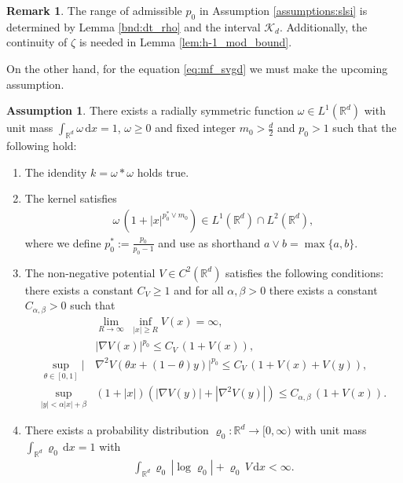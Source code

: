 \documentclass[reqno, 11pt]{amsart}
\numberwithin{equation}{section}
\theoremstyle{definition}
\newtheorem{Ass}[thm]{Assumption}
\newtheorem{rem}[thm]{Remark}
\begin{document}
\begin{rem}
    The range of admissible $p_0$ in Assumption \ref{assumptions:slsi} is determined by Lemma \ref{bnd:dt_rho} and the interval $\mathcal{K}_d$. Additionally, the continuity of $\zeta$ is needed in Lemma \ref{lem:h-1_mod_bound}.
\end{rem}

On the other hand, for the equation \eqref{eq:mf_svgd} we must make the upcoming assumption.

\begin{Ass}\label{assumptions:pot}
    There exists a radially symmetric function $\omega\in L^1(\mathbb{R}^{d})$ with unit mass $\int_{\mathbb{R}^{d}}\omega\,\mathrm{d} x=1$, $\omega \geq 0$ and fixed integer $m_0>\frac{d}{2}$ and $p_0>1$ such that the following hold:
    \begin{enumerate}[label=(B\arabic*)]
        \item The idendity $k=\omega\ast\omega$ holds true.
        \item\label{ass:sob_kern} The kernel satisfies
        \begin{align}
            \omega\,(1+|x|^{p_0^\ast\vee m_0})\in L^1(\mathbb{R}^d) \cap L^2(\mathbb{R}^d),
            \label{eq:pot_omega}
        \end{align}
        where we define $p_0^\ast:=\frac{p_0}{p_0-1}$ and use as shorthand $a\vee b=\max\{a,b\}$.
        
        \item\label{ass:pot}
        The non-negative potential $V\in C^2(\mathbb{R}^{d})$ satisfies the following conditions: there exists a constant $C_V \geq 1$ and for all $\alpha, \beta > 0$ there exists a constant $C_{\alpha,\beta} > 0$ such that
        \begin{align}
            & \lim_{R\to\infty} \;\inf_{|x|\geq R} V(x)=\infty,\label{eq:coercive}\\
            &|\nabla V(x)|^{p_0} \leq C_V \, (1+ V(x)),\label{eq:bound_nabla_V_by_V}\\
            \sup_{\theta\in [0,1]}|&\nabla^2 V(\theta x+(1-\theta)y)|^{p_0}\leq C_V\,(1+V(x)+V(y)),
            \label{eq:bound_hessian_V}\\
            \sup_{|y|<\alpha|x|+\beta} &(1+|x|)(|\nabla V(y)|+|\nabla^2 V(y)|)\leq C_{\alpha,\beta}\, (1+V(x)).
            \label{eq:bound_nabla_hessian_V}
        \end{align}
        \item\label{ass:init} There exists a probability distribution $\varrho_0:\mathbb{R}^{d} \to [0,\infty)$ with unit mass $\int_{\mathbb{R}^{d}} \varrho_0 \,\mathrm{d} x= 1$ with
        \begin{align*}
            \int_{\mathbb{R}^{d}} \varrho_0\, |\log \varrho_0| + \varrho_0\, V \,\mathrm{d} x
            < \infty.
        \end{align*}
    \end{enumerate}
\end{Ass}
\end{document}
